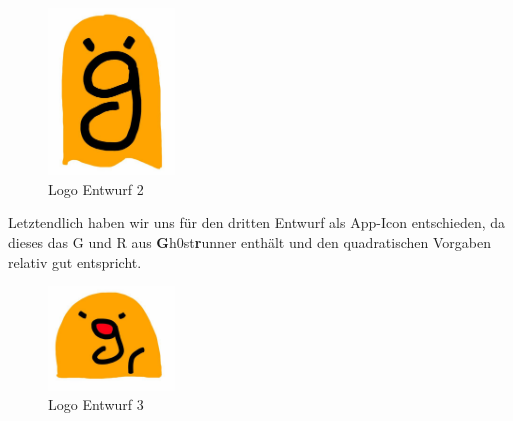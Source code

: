 \begin{figure}[!h]
\centering
\includegraphics[width=0.3\textwidth]{abb/icon_entwurf2}
\caption{Logo Entwurf 2}
\end{figure}
Letztendlich haben wir uns für den dritten Entwurf als App-Icon entschieden, da dieses das G und R aus \textbf{G}h0st\textbf{r}unner enthält und den quadratischen Vorgaben relativ gut entspricht.
\begin{figure}[!h]
\centering
\includegraphics[width=0.3\textwidth]{abb/icon_entwurf3}
\caption{Logo Entwurf 3}
\end{figure}